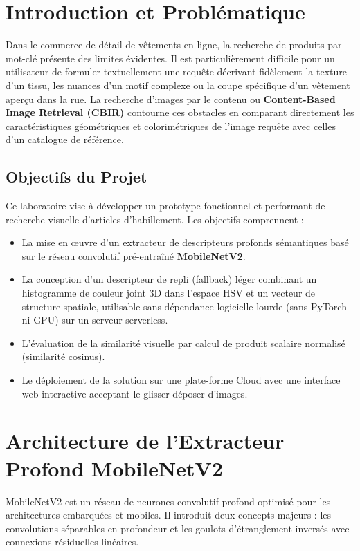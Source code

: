 \documentclass[12pt,a4paper]{article}
\begin{document}
\tableofcontents
\newpage

\section{Introduction et Problématique}
Dans le commerce de détail de vêtements en ligne, la recherche de produits par mot-clé présente des limites évidentes. Il est particulièrement difficile pour un utilisateur de formuler textuellement une requête décrivant fidèlement la texture d'un tissu, les nuances d'un motif complexe ou la coupe spécifique d'un vêtement aperçu dans la rue. La recherche d'images par le contenu ou \textbf{Content-Based Image Retrieval (CBIR)} contourne ces obstacles en comparant directement les caractéristiques géométriques et colorimétriques de l'image requête avec celles d'un catalogue de référence.

\subsection{Objectifs du Projet}
Ce laboratoire vise à développer un prototype fonctionnel et performant de recherche visuelle d'articles d'habillement. Les objectifs comprennent :
\begin{itemize}
    \item La mise en œuvre d'un extracteur de descripteurs profonds sémantiques basé sur le réseau convolutif pré-entraîné \textbf{MobileNetV2}.
    \item La conception d'un descripteur de repli (fallback) léger combinant un histogramme de couleur joint 3D dans l'espace HSV et un vecteur de structure spatiale, utilisable sans dépendance logicielle lourde (sans PyTorch ni GPU) sur un serveur serverless.
    \item L'évaluation de la similarité visuelle par calcul de produit scalaire normalisé (similarité cosinus).
    \item Le déploiement de la solution sur une plate-forme Cloud avec une interface web interactive acceptant le glisser-déposer d'images.
\end{itemize}

\section{Architecture de l'Extracteur Profond MobileNetV2}
MobileNetV2 est un réseau de neurones convolutif profond optimisé pour les architectures embarquées et mobiles. Il introduit deux concepts majeurs : les convolutions séparables en profondeur et les goulots d'étranglement inversés avec connexions résiduelles linéaires.
\end{document}
